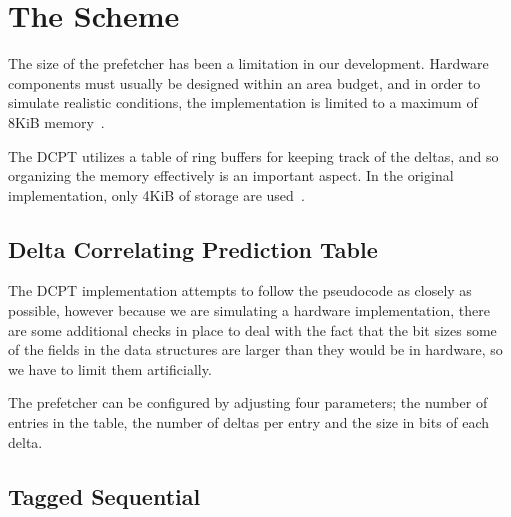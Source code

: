 \section{The Scheme}


The size of the prefetcher has been a limitation in our development. Hardware
components must usually be designed within an area budget, and in order to
simulate realistic conditions, the implementation is limited to a maximum of
8KiB memory~\cite{guidelines}.


The DCPT utilizes a table of ring buffers for keeping track of the deltas, and
so organizing the memory effectively is an important aspect. In the original
implementation, only 4KiB of storage are used~\cite{dcpt}.


\subsection{Delta Correlating Prediction Table}

The DCPT implementation attempts to follow the pseudocode as closely as possible,
however because we are simulating a hardware implementation, there are some additional
checks in place to deal with the fact that the bit sizes some of the fields in the
data structures are larger than they would be in hardware, so we have to limit them
artificially.

The prefetcher can be configured by adjusting four parameters; the number of entries
in the table, the number of deltas per entry and the size in bits of each delta.

\subsection{Tagged Sequential}

